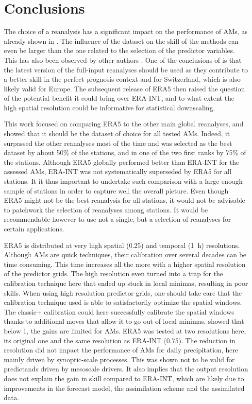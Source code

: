 \documentclass[alpha-refs]{wiley-article}
\begin{document}
\section{Conclusions}
\label{sec:conclusion}

The choice of a reanalysis has a significant impact on the performance of AMs, as already shown in \citet{Horton2018b}. The influence of the dataset on the skill of the methods can even be larger than the one related to the selection of the predictor variables. This has also been observed by other authors \cite{Dayon2015}. One of the conclusions of \citet{Horton2018b} is that the latest version of the full-input reanalyses should be used as they contribute to a better skill in the perfect prognosis context and for Switzerland, which is also likely valid for Europe. The subsequent release of ERA5 then raised the question of the potential benefit it could bring over ERA-INT, and to what extent the high spatial resolution could be informative for statistical downscaling.

This work focused on comparing ERA5 to the other main global reanalyses, and showed that it should be the dataset of choice for all tested AMs. Indeed, it surpassed the other reanalyses most of the time and was selected as the best dataset by about 50\% of the stations, and in one of the two first ranks by 75\% of the stations. Although ERA5 globally performed better than ERA-INT for the assessed AMs, ERA-INT was not systematically superseded by ERA5 for all stations. It it thus important to undertake such comparison with a large enough sample of stations in order to capture well the overall picture. Even though ERA5 might not be the best reanalysis for all stations, it would not be advisable to patchwork the selection of reanalyses among stations. It would be recommendable however to use not a single, but a selection of reanalyses for certain applications.

ERA5 is distributed at very high spatial (0.25\degree) and temporal (1~h) resolutions. Although AMs are quick techniques, their calibration over several decades can be time consuming. This time increases all the more with a higher spatial resolution of the predictor grids. The high resolution even turned into a trap for the calibration technique here that ended up stuck in local minimas, resulting in poor skills. When using high resolution predictor grids, one should take care that the calibration technique used is able to satisfactorily optimize the spatial windows. The classic+ calibration \citep{Horton2019} could here successfully calibrate the spatial windows thanks to additional moves that allow it to go out of local minimas. \citet{Horton2018b} showed that below 1\degree, the gains are limited for AMs. ERA5 was tested at two resolutions here, its original one and the same resolution as ERA-INT (0.75\degree). The reduction in resolution did not impact the performance of AMs for daily precipitation, here mainly driven by synoptic-scale processes. This was shown not to be valid for predictands driven by mesoscale drivers. It also implies that the output resolution does not explain the gain in skill compared to ERA-INT, which are likely due to improvements in the forecast model, the assimilation scheme and the assimilated data.
\end{document}
